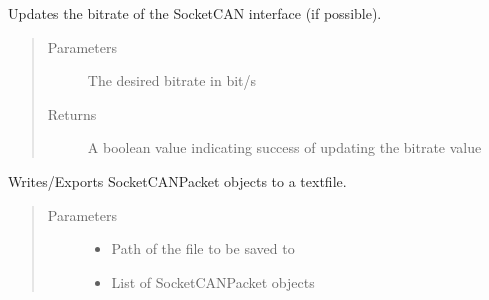 \documentclass[letterpaper,10pt,english]{sphinxmanual}
\begin{document}
\begin{fulllineitems}

\begin{fulllineitems}
\label{\detokenize{src:src.CANData.CANData.updateBitrate}}
Updates the bitrate of the SocketCAN interface (if possible).
\begin{quote}\begin{description}
\item[{Parameters}] \leavevmode
{} \textendash{} The desired bitrate in bit/s

\item[{Returns}] \leavevmode
A boolean value indicating success of updating the bitrate value

\end{description}\end{quote}

\end{fulllineitems}


\begin{fulllineitems}
\label{\detokenize{src:src.CANData.CANData.writeCANFile}}
Writes/Exports SocketCANPacket objects to a textfile.
\begin{quote}\begin{description}
\item[{Parameters}] \leavevmode\begin{itemize}
\item {} 
 \textendash{} Path of the file to be saved to

\item {} 
 \textendash{} List of SocketCANPacket objects

\end{itemize}

\end{description}\end{quote}

\end{fulllineitems}


\end{fulllineitems}

\end{document}
